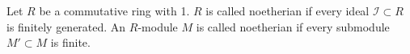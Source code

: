 Let $R$ be a commutative ring with 1. $R$ is called noetherian if every ideal $\mathcal{I} \subset R$ is finitely generated. An $R$-module $M$ is called noetherian if every submodule $M' \subset M$ is finite.

